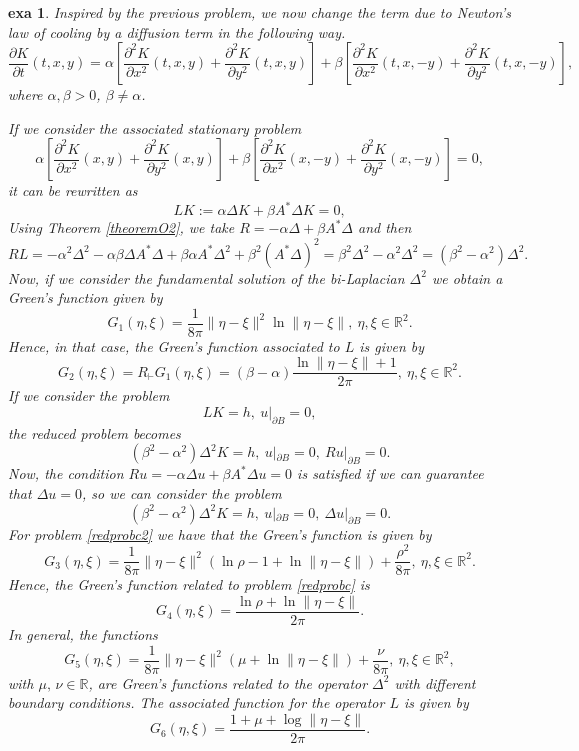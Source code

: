 \documentclass[a4paper,12pt,onecolumn]{article}
\theoremstyle{ptheorem}
\theoremstyle{hdef}
\theoremstyle{premark}
\newtheorem{exa}[thm]{exa}
\numberwithin{equation}{section}
\numberwithin{figure}{section}
\newcommand{\bR}{{\mathbb R}}
\renewcommand{\a}{\alpha}
\renewcommand{\b}{\beta}
\newcommand{\<}{\langle}
\renewcommand{\>}{\rangle}
\renewcommand{\<}{\left<}
\renewcommand{\>}{\right>}
\renewcommand{\(}{\left(}
\renewcommand{\)}{\right)}
\begin{document}
\begin{exa} Inspired by the previous problem, we now change the term due to Newton's law of cooling by a diffusion term in the following way.
	\[\frac{\partial{K}}{\partial t}(t,x,y)=\a\left[\frac{\partial^2 K}{\partial x^2}(t,x,y)+\frac{\partial^2 K}{\partial y^2}(t,x,y)\right]+\b\left[\frac{\partial^2 K}{\partial x^2}(t,x,-y)+\frac{\partial^2 K}{\partial y^2}(t,x,-y)\right],\]
	where $\a,\b>0$, $\b\ne\a$.\par
	If we consider the associated stationary problem
	\[\a\left[\frac{\partial^2 K}{\partial x^2}(x,y)+\frac{\partial^2 K}{\partial y^2}(x,y)\right]+\b\left[\frac{\partial^2 K}{\partial x^2}(x,-y)+\frac{\partial^2 K}{\partial y^2}(x,-y)\right]=0,\]
	it can be rewritten as
	\[LK:=\a\Delta K+\b A^*\Delta K=0,\]
Using Theorem \ref{theoremO2}, we take $R=-\a\Delta +\b A^*\Delta $ and then
	\[RL=-\a^2\Delta^2-\a\b\Delta A^*\Delta+\b\a A^*\Delta^2+\b^2(A^*\Delta)^2=\b^2\Delta^2-\a^2\Delta^2=(\b^2-\a^2)\Delta^2.\]
	Now, if we consider the fundamental solution of the bi-Laplacian $\Delta^2$ \cite[equation~(2.61)]{Gaz} we obtain a Green's function given by
	\[G_1(\eta,\xi)=\frac{1}{8\pi}\|\eta-\xi\|^2\ln\|\eta-\xi\|,\  \eta,\xi\in\bR^2.\]
	Hence, in that case, the Green's function associated to $L$ is given by
	\[G_2(\eta,\xi)=R_\vdash G_1(\eta,\xi)=(\b-\a)\frac{\ln \|\eta-\xi\|+1}{2 \pi },\ \eta,\xi\in\bR^2.\]
	If we consider the problem
	\[LK=h,\ u|_{\partial B}=0,\]
	the reduced problem becomes
	\begin{equation}
	\label{redprobc}
	(\b^2-\a^2)\Delta^2K=h,\ u|_{\partial B}=0,\ Ru|_{\partial B}=0.\end{equation}
	Now, the condition $Ru=-\a\Delta u +\b A^*\Delta u=0$ is satisfied if we can guarantee that $\Delta u=0$, so we can consider the problem
	\begin{equation}\label{redprobc2}(\b^2-\a^2)\Delta^2K=h,\ u|_{\partial B}=0,\ \Delta u|_{\partial B}=0.
	\end{equation}
	For problem \eqref{redprobc2} we have that the Green's function is given by
	\[G_3(\eta,\xi)=\frac{1}{8\pi}\|\eta-\xi\|^2\(\ln \rho-1+\ln\|\eta-\xi\|\)+\frac{\rho^2}{8\pi},\  \eta,\xi\in\bR^2.\]
	Hence, the Green's function related to problem \eqref{redprobc} is 
	\[G_4(\eta,\xi)=\frac{ \ln \rho+\ln \|\eta-\xi\|}{2 \pi }.\]
	In general, the functions
	\[G_5(\eta,\xi)=\frac{1}{8\pi}\|\eta-\xi\|^2\( \mu+\ln\|\eta-\xi\|\)+\frac{\nu}{8\pi},\  \eta,\xi\in\bR^2,\]
	with $\mu,\,\nu\in\bR$, are Green's functions related to the operator $\Delta^2$ with different boundary conditions. The associated function for the operator $L$ is given by
	\[G_6(\eta,\xi)=\frac{1+ \mu+\log \|\eta-\xi\|}{2 \pi }.\]
	\end{exa}
\end{document}

